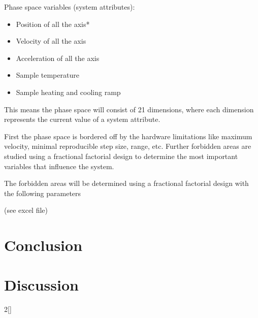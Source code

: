 \documentclass[10pt]{article}
\begin{document}
Phase space variables (system attributes):
\begin{itemize}
    \item Position of all the axis*
    \item Velocity of all the axis
    \item Acceleration of all the axis
    \item Sample temperature
    \item Sample heating and cooling ramp
\end{itemize}

This means the phase space will consist of 21 dimensions, where each dimension represents the current value of a system attribute.

First the phase space is bordered off by the hardware limitations like maximum velocity, minimal reproducible step size, range, etc.
Further forbidden areas are studied using a fractional factorial design to determine the most important variables that influence the system.

The forbidden areas will be determined using a fractional factorial design with the following parameters

(see excel file)




\clearpage
\section{Conclusion}

\section{Discussion}


\newpage
\begin{multicols*}
{2}[\printbibheading]
    \AtNextBibliography{\footnotesize}
    \printbibliography[heading = none]
\end{multicols*}

\clearpage
\appendix
\end{document}
